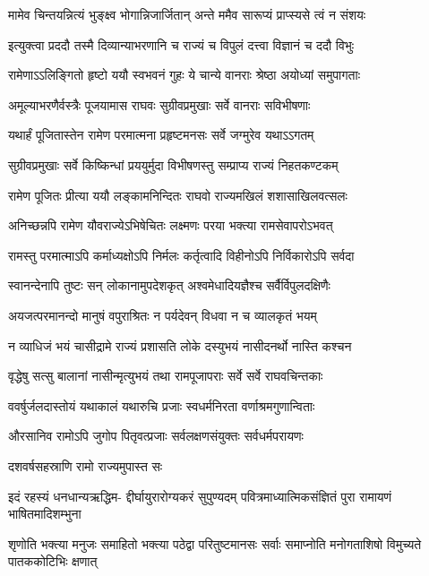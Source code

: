 \twolineshloka
{मामेव चिन्तयन्नित्यं भुङ्क्ष्व भोगान्निजार्जितान्}
{अन्ते ममैव सारूप्यं प्राप्स्यसे त्वं न संशयः} %

\twolineshloka
{इत्युक्त्वा प्रददौ तस्मै दिव्यान्याभरणानि च}
{राज्यं च विपुलं दत्त्वा विज्ञानं च ददौ विभुः} %

\twolineshloka
{रामेणाऽऽलिङ्गितो हृष्टो ययौ स्वभवनं गुहः}
{ये चान्ये वानराः श्रेष्ठा अयोध्यां समुपागताः} %

\twolineshloka
{अमूल्याभरणैर्वस्त्रैः पूजयामास राघवः}
{सुग्रीवप्रमुखाः सर्वे वानराः सविभीषणाः} %

\twolineshloka
{यथार्हं पूजितास्तेन रामेण परमात्मना}
{प्रहृष्टमनसः सर्वे जग्मुरेव यथाऽऽगतम्} %

\twolineshloka
{सुग्रीवप्रमुखाः सर्वे किष्किन्धां प्रययुर्मुदा}
{विभीषणस्तु सम्प्राप्य राज्यं निहतकण्टकम्} %

\twolineshloka
{रामेण पूजितः प्रीत्या ययौ लङ्कामनिन्दितः}
{राघवो राज्यमखिलं शशासाखिलवत्सलः} %

\twolineshloka
{अनिच्छन्नपि रामेण यौवराज्येऽभिषेचितः}
{लक्ष्मणः परया भक्त्या रामसेवापरोऽभवत्} %

\twolineshloka
{रामस्तु परमात्माऽपि कर्माध्यक्षोऽपि निर्मलः}
{कर्तृत्वादि विहीनोऽपि निर्विकारोऽपि सर्वदा} %

\twolineshloka
{स्वानन्देनापि तुष्टः सन् लोकानामुपदेशकृत्}
{अश्वमेधादियज्ञैश्च सर्वैर्विपुलदक्षिणैः} %

\twolineshloka
{अयजत्परमानन्दो मानुषं वपुराश्रितः}
{न पर्यदेवन् विधवा न च व्यालकृतं भयम्} %

\twolineshloka
{न व्याधिजं भयं चासीद्रामे राज्यं प्रशासति}
{लोके दस्युभयं नासीदनर्थो नास्ति कश्चन} %

\twolineshloka
{वृद्धेषु सत्सु बालानां नासीन्मृत्युभयं तथा}
{रामपूजापराः सर्वे सर्वे राघवचिन्तकाः} %

\twolineshloka
{ववर्षुर्जलदास्तोयं यथाकालं यथारुचि}
{प्रजाः स्वधर्मनिरता वर्णाश्रमगुणान्विताः} %

\twolineshloka
{औरसानिव रामोऽपि जुगोप पितृवत्प्रजाः}
{सर्वलक्षणसंयुक्तः सर्वधर्मपरायणः} %

{दशवर्षसहस्राणि रामो राज्यमुपास्त सः} %


\fourlineindentedshloka
{इदं रहस्यं धनधान्यऋद्धिम-}
{द्दीर्घायुरारोग्यकरं सुपुण्यदम्}
{पवित्रमाध्यात्मिकसंज्ञितं पुरा}
{रामायणं भाषितमादिशम्भुना} %

\fourlineindentedshloka
{शृणोति भक्त्या मनुजः समाहितो}
{भक्त्या पठेद्वा परितुष्टमानसः}
{सर्वाः समाप्नोति मनोगताशिषो}
{विमुच्यते पातककोटिभिः क्षणात्} %


